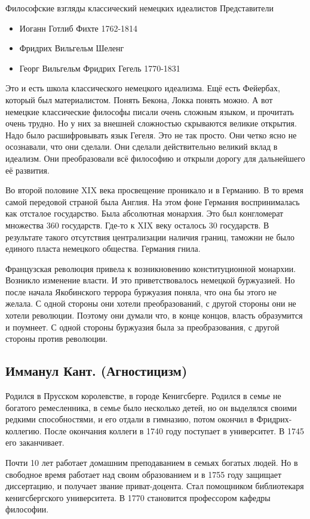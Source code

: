 Философские взгляды классический немецких идеалистов
Представители

\begin{itemize}
    \item Иоганн Готлиб Фихте 1762-1814
    \item Фридрих Вильгельм Шеленг
    \item Георг Вильгельм Фридрих Гегель 1770-1831
\end{itemize}

Это и есть школа классического немецкого идеализма. Ещё есть Фейербах, который был материалистом. Понять Бекона, Локка понять можно. А вот немецкие классические философы писали очень сложным языком, и прочитать очень трудно. Но у них за внешней сложностью скрываются великие открытия. Надо было расшифровывать язык Гегеля. Это не так просто. Они четко ясно не осознавали, что они сделали. Они сделали действительно великий вклад в идеализм. Они преобразовали всё философию и открыли дорогу для дальнейшего её развития.

Во второй половине XIX века просвещение проникало и в Германию. В то время самой передовой страной была Англия. На этом фоне Германия воспринималась как отсталое государство. Была абсолютная монархия. Это был конгломерат множества 360 государств. Где-то к XIX веку осталось 30 государств. В результате такого отсутствия централизации наличия границ, таможни не было единого пласта немецкого общества. Германия гнила.

Французская революция привела к возникновению конституционной монархии. Возникло изменение власти. И это приветствовалось немецкой буржуазией. Но после начала Якобинского террора буржуазия поняла, что она бы этого не желала. С одной стороны они хотели преобразований, с другой стороны они не хотели революции. Поэтому они думали что, в конце концов, власть образумится и поумнеет. С одной стороны буржуазия была за преобразования, с другой стороны против революции.
\subsection{Имманул Кант. (Агностицизм)}

Родился в Прусском королевстве, в городе Кенигсберге. Родился в семье не богатого ремесленника, в семье было несколько детей, но он выделялся своими редкими способностями, и его отдали в гимназию, потом окончил в Фридрих-коллегию. После окончания коллеги в 1740 году поступает в университет. В 1745 его заканчивает.

Почти 10 лет работает домашним преподаванием в семьях богатых людей. Но в свободное время работает над своим образованием и в 1755 году защищает диссертацию, и получает звание приват-доцента. Стал помощником библиотекаря кенигсбергского университета. В 1770 становится профессором кафедры философии.

